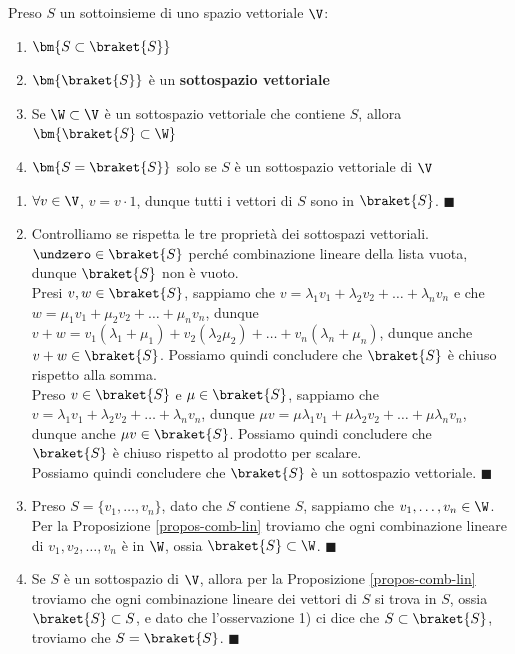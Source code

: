 \documentclass[11pt, a4paper, titlepage, oneside]{scrbook}
\begin{document}
\begin{Osservazione}[]
\label{oss-comb-lin}
Preso $S$ un sottoinsieme di uno spazio vettoriale $\V$:
\begin{enumerate}
    \item $\bm{S \subset \braket{S}}$
    \item $\bm{\braket{S}}$ è un \textbf{sottospazio vettoriale}
    \item Se $\W \subset \V$ è un sottospazio vettoriale che contiene $S$, allora $\bm{\braket{S} \subset \W}$
    \item $\bm{S = \braket{S}}$ solo se $S$ è un sottospazio vettoriale di $\V$ 
\end{enumerate}
\end{Osservazione}

\Dimostrazione \nopagebreak

\begin{enumerate}
    \item $\forall v \in \V$, $v = v \cdot 1$, dunque tutti i vettori di $S$ sono in $\braket{S}$. $\blacksquare$
    \item Controlliamo se rispetta le tre proprietà dei sottospazi vettoriali. \\
          $\undzero \in \braket{S}$ perché combinazione lineare della lista vuota, dunque $\braket{S}$ non è vuoto.\\
          Presi $v,w \in \braket{S}$, sappiamo che $v = \lambda_1 v_1 + \lambda_2 v_2 + \ldots + \lambda_n v_n$ e che $w = \mu_1 v_1 + \mu_2 v_2 + \ldots + \mu_n v_n$, dunque $v + w = v_1(\lambda_1 + \mu_1) + v_2 (\lambda_2 \mu_2) + \ldots + v_n (\lambda_n + \mu_n)$, dunque anche $v + w \in \braket{S}$. Possiamo quindi concludere che $\braket{S}$ è chiuso rispetto alla somma.\\
          Preso $v \in \braket{S}$ e $\mu \in \braket{S}$, sappiamo che $v = \lambda_1 v_1 + \lambda_2 v_2 + \ldots + \lambda_n v_n$, dunque \mbox{$\mu v = \mu \lambda_1 v_1 + \mu \lambda_2 v_2 + \ldots + \mu \lambda_n v_n$}, dunque anche $\mu v \in \braket{S}$. Possiamo quindi concludere che $\braket{S}$ è chiuso rispetto al prodotto per scalare.\\
          Possiamo quindi concludere che $\braket{S}$ è un sottospazio vettoriale. $\blacksquare$
    \item Preso $S = \{v_1, \ldots, v_n\}$, dato che $S$ contiene $S$, sappiamo che $v_1, \ldots, v_n \in \W$. Per la Proposizione \ref{propos-comb-lin} troviamo che ogni combinazione lineare di $v_1, v_2, \ldots, v_n$ è in $\W$, ossia $\braket{S} \subset \W$. $\blacksquare$
    \item Se $S$ è un sottospazio di $\V$, allora per la Proposizione \ref{propos-comb-lin} troviamo che ogni combinazione lineare dei vettori di $S$ si trova in $S$, ossia $\braket{S} \subset S$, e dato che l'osservazione 1) ci dice che $S \subset \braket{S}$, troviamo che $S = \braket{S}$. $\blacksquare$
\end{enumerate}
\end{document}
